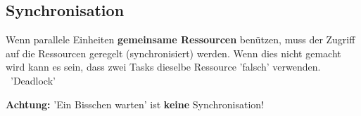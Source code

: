 \subsection{Synchronisation}

Wenn parallele Einheiten \textbf{gemeinsame Ressourcen} benützen, muss der Zugriff auf die Ressourcen geregelt (synchronisiert) werden.
Wenn dies nicht gemacht wird kann es sein, dass zwei Tasks dieselbe Ressource 'falsch' verwenden. \textrightarrow\ 'Deadlock'

\vspace{0.1cm}

\textbf{Achtung: } 'Ein Bisschen warten' ist \textbf{keine} Synchronisation!


